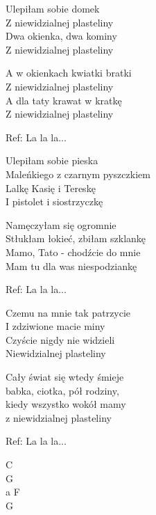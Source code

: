 \begin{text}
    Ulepiłam sobie domek\\
    Z niewidzialnej plasteliny\\
    Dwa okienka, dwa kominy\\
    Z niewidzialnej plasteliny

    A w okienkach kwiatki bratki\\
    Z niewidzialnej plasteliny\\
    A dla taty krawat w kratkę\\
    Z niewidzialnej plasteliny

    \vin Ref: La la la...

    Ulepiłam sobie pieska\\
    Maleńkiego z czarnym pyszczkiem\\
    Lalkę Kasię i Tereskę\\
    I pistolet i siostrzyczkę
    
    Namęczyłam się ogromnie\\
    Stłukłam łokieć, zbiłam szklankę\\
    Mamo, Tato - chodźcie do mnie\\
    Mam tu dla was niespodziankę

    \vin Ref: La la la...

    Czemu na mnie tak patrzycie\\
    I zdziwione macie miny\\
    Czyście nigdy nie widzieli\\
    Niewidzialnej plasteliny

    Cały świat się wtedy śmieje\\
    babka, ciotka, pół rodziny,\\
    kiedy wszystko wokół mamy\\
    z niewidzialnej plasteliny

    \vin Ref: La la la...
\end{text}
\begin{chord}
    C\\
    G\\
    a F\\
    G
\end{chord}